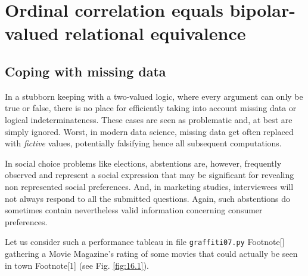 \chapter[Ordinal Correlation]{Ordinal correlation equals bipolar-valued relational equivalence}
\label{sec:16}

\abstract*{}

\abstract{}

\section{Coping with missing data}
\label{sec:16.1}

In a stubborn keeping with a two-valued logic, where every argument can only be true or false, there is no place for efficiently taking into account missing data or logical indeterminateness. These cases are seen as problematic and, at best are simply ignored. Worst, in modern data science, missing data get often replaced with \emph{fictive} values, potentially falsifying hence all subsequent computations.

In social choice problems like elections, abstentions are, however, frequently observed and represent a social expression that may be significant for revealing non represented social preferences. And, in marketing studies, interviewees will not always respond to all the submitted questions. Again, such abstentions do sometimes contain nevertheless valid information concerning consumer preferences.

Let us consider such a performance tableau in file \texttt{graffiti07.py} Footnote[] gathering a Movie Magazine's rating of some movies that could actually be seen in town Footnote[1] (see Fig. \ref{fig:16.1}).


